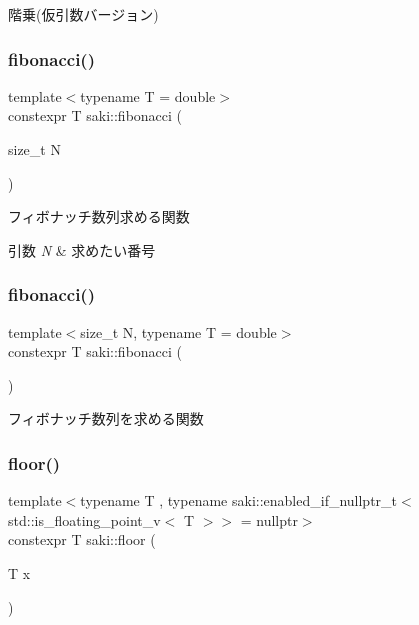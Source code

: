 階乗(仮引数バージョン) 

\mbox{\label{namespacesaki_a93bb6ae29766c4204c1cf8dc5bab007c}} 
\subsubsection{\texorpdfstring{fibonacci()}{fibonacci()}\hspace{0.1cm}{\footnotesize\ttfamily [1/2]}}
{\footnotesize\ttfamily template$<$typename T  = double$>$ \\
constexpr T saki\+::fibonacci (\begin{DoxyParamCaption}\item[{size\+\_\+t}]{N }\end{DoxyParamCaption})}



フィボナッチ数列求める関数 


\begin{DoxyParams}{引数}
{\em N} & 求めたい番号 \\
\hline
\end{DoxyParams}
\mbox{\label{namespacesaki_a7bbb434ee3c6d77eeb32b85bb9e316f0}} 
\subsubsection{\texorpdfstring{fibonacci()}{fibonacci()}\hspace{0.1cm}{\footnotesize\ttfamily [2/2]}}
{\footnotesize\ttfamily template$<$size\+\_\+t N, typename T  = double$>$ \\
constexpr T saki\+::fibonacci (\begin{DoxyParamCaption}{ }\end{DoxyParamCaption})}



フィボナッチ数列を求める関数 

\mbox{\label{namespacesaki_a0718c031975604811084b62bbba93f7f}} 
\subsubsection{\texorpdfstring{floor()}{floor()}\hspace{0.1cm}{\footnotesize\ttfamily [1/2]}}
{\footnotesize\ttfamily template$<$typename T , typename saki\+::enabled\+\_\+if\+\_\+nullptr\+\_\+t$<$ std\+::is\+\_\+floating\+\_\+point\+\_\+v$<$ T $>$$>$  = nullptr$>$ \\
constexpr T saki\+::floor (\begin{DoxyParamCaption}\item[{T}]{x }\end{DoxyParamCaption})}



